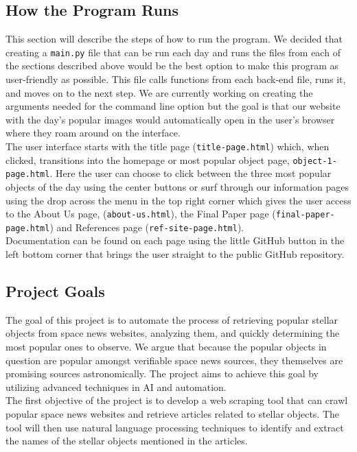 \documentclass[12pt,letterpaper]{article}
\begin{document}
\subsection*{How the Program Runs}
This section will describe the steps of how to run the program. We  decided that 
creating a \texttt{main.py} file that can be run each day and runs the files from 
each of the sections described above would be the best option to make this program 
as user-friendly as possible. This file calls functions from each back-end file, 
runs it, and moves on to the next step. We are currently working on creating the 
arguments needed for the command line option but the goal is that our website with 
the day's popular images would automatically open in the user's browser where they 
roam around on the interface.\\

The user interface starts with the title page (\texttt{title-page.html}) which, when 
clicked, transitions into the homepage or most popular object page,
\texttt{object-1-page.html}. Here the user can choose to click between the three most 
popular objects of the day using the center buttons or surf through our information 
pages using the drop across the menu in the top right corner which gives the user access 
to the About Us page, (\texttt{about-us.html}), the Final Paper page
 (\texttt{final-paper-page.html}) and References page (\texttt{ref-site-page.html}). \\

Documentation can be found on each page using the little GitHub button in the left bottom 
corner that brings the user straight to the public GitHub repository.

\subsection*{Project Goals}
The goal of this project is to automate the process of retrieving popular stellar objects 
from space news websites, analyzing them, and quickly determining the most popular ones to 
observe. We argue that because the popular objects in question are popular amongst
verifiable space news sources, they themselves are promising sources astronomically. 
The project aims to achieve this goal by utilizing advanced techniques in AI and 
automation.\\

The first objective of the project is to develop a web scraping tool that can 
crawl popular space news websites and retrieve articles related to stellar objects. 
The tool will then use natural language processing techniques to identify and extract 
the names of the stellar objects mentioned in the articles.\\
\end{document}
